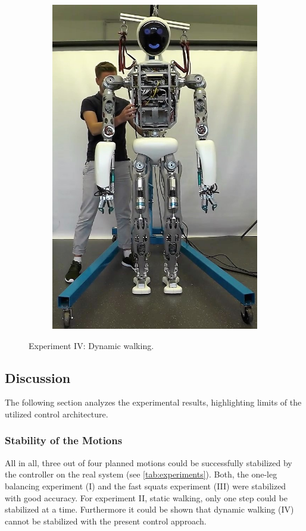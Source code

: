 \begin{figure}[h!]
\begin{subfigure}{.2\textwidth}
	\includegraphics[width=.95\linewidth]{experiments/walkDynamic/snaps/5}
	\end{subfigure}%
\caption{Experiment IV: Dynamic walking.}
\label{exp:dynamicWalkingSnaps}
\end{figure} 

\subsection{Discussion}
The following section analyzes the experimental results, highlighting limits of the utilized control architecture.
\subsubsection{Stability of the Motions}
All in all, three out of four planned motions could be successfully stabilized by the  controller on the real system (see \cref{tab:experiments}). Both, the one-leg balancing experiment (I) and the fast squats experiment (III) were stabilized with good accuracy. For experiment II, static walking, only one step could be stabilized at a time. Furthermore it could be shown that dynamic walking (IV) cannot be stabilized with the present control approach. 
